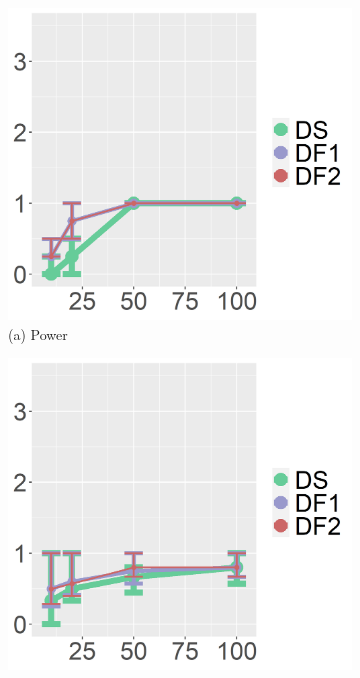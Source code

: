 \captionsetup[subfigure]{labelformat=empty}
\begin{figure}[ht!]
\centering
\begin{subfigure}[b]{.40\columnwidth} 
    \includegraphics[width=\columnwidth]{../../plot/power_1_IQR.png}
    \caption{(a) Power}
\end{subfigure}
\hfill
\centering
\begin{subfigure}[b]{.40\columnwidth} 
    \includegraphics[width=\columnwidth]{../../plot/precision_1_IQR.png}

\end{subfigure}
\end{figure}
